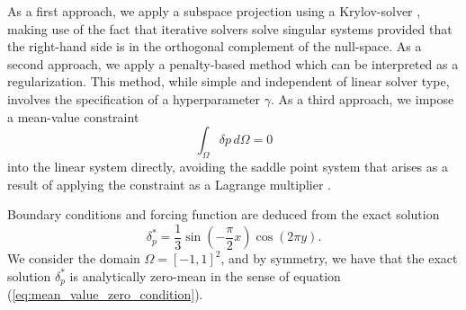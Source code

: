 As a first approach, we apply a subspace projection using a Krylov-solver \cite{vorst_iterative_2003}, making use of the fact that iterative solvers solve singular systems provided that the right-hand side is in the orthogonal complement of the null-space.
As a second approach, we apply a penalty-based method which can be interpreted as a regularization.
This method, while simple and independent of linear solver type, involves the specification of a hyperparameter $\gamma$.
As a third approach, we impose a mean-value constraint 
\begin{equation}
  \int_{\Omega}^{} \delta p \,d\Omega = 0
  \label{eq:mean_value_zero_condition}
\end{equation}
into the linear system directly, avoiding the saddle point system that arises as a result of applying the constraint as a Lagrange multiplier \cite{bochev_finite_2005}.


Boundary conditions and forcing function are deduced from the exact solution
\begin{equation}
    \delta_p^* = \frac{1}{3} \sin\left(-\frac{\pi}{2} x \right) \cos\left(2\pi y\right).
\end{equation}
We consider the domain $\Omega = [-1, 1]^2$, and by symmetry, we have that the exact solution $\delta_p^*$ is analytically zero-mean in the sense of equation (\ref{eq:mean_value_zero_condition}).

